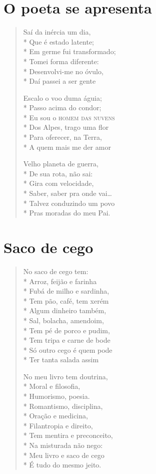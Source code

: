 
\cleardoublepage


\chapter{O poeta se apresenta}

\begin{verse}
Saí da inércia um dia,\\*
Que é estado latente;\\*
Em germe fui transformado;\\*
Tomei forma diferente:\\*
Desenvolvi-me no óvulo,\\*
Daí passei a ser gente

Escalo o voo duma águia;\\*
Passo acima do condor;\\*
Eu sou o \textsc{homem das nuvens}\\*
Dos Alpes, trago uma flor\\*
Para oferecer, na Terra,\\*
A quem mais me der amor

Velho planeta de guerra,\\*
De sua rota, não sai:\\*
Gira com velocidade,\\*
Saber, saber pra onde vai\ldots{}\\*
Talvez conduzindo um povo\\*
Pras moradas do meu Pai.
\end{verse}

\chapter{Saco de cego}

\begin{verse}
No saco de cego tem:\\*
Arroz, feijão e farinha\\*
Fubá de milho e sardinha,\\*
Tem pão, café, tem xerém\\*
Algum dinheiro também,\\*
Sal, bolacha, amendoim,\\*
Tem pé de porco e pudim,\\*
Tem tripa e carne de bode\\*
Só outro cego é quem pode\\*
Ter tanta salada assim

No meu livro tem doutrina,\\*
Moral e filosofia,\\*
Humorismo, poesia.\\*
Romantismo, disciplina,\\*
Oração e medicina,\\*
Filantropia e direito,\\*
Tem mentira e preconceito,\\*
Na misturada não nego:\\*
Meu livro e saco de cego\\*
É tudo do mesmo jeito.
\end{verse}



